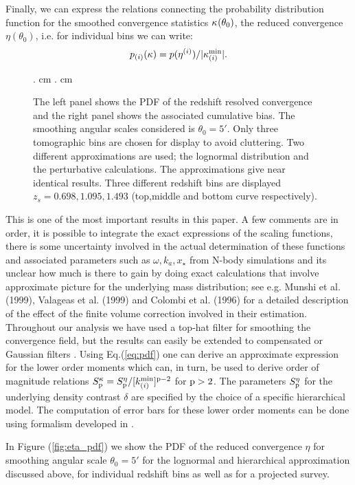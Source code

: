 \documentclass[usenatbib]{mn2e}
\def\be{\begin{equation}}
\def\ee{\end{equation}}
\def\be{\begin{equation}}
\def\ee{\end{equation}}
\begin{document}
Finally, we can express the relations connecting the probability distribution
function for the smoothed convergence statistics
$\kappa_{\rm  }({\theta_0})$, the reduced
convergence $\eta({\theta_0})$, i.e. for individual bins we can write:
\be
p_{(i)}(\kappa) ={p(\eta^{(i)})/|\kappa^{\rm min}_{(i)}|}.
\label{eq:pdf}
\ee
%
\begin{figure}
\begin{center}
{. cm . cm {}}
\end{center}
\caption{The left panel shows the PDF of the redshift resolved convergence and the right panel shows the associated cumulative
bias. The smoothing angular scales considered is $\theta_0 = 5'$. Only three tomographic bins are chosen for display to avoid cluttering. 
Two different approximations are used; the lognormal distribution and the perturbative calculations. The approximations 
give near identical results. Three different redshift bins are displayed $z_s=0.698,1.095,1.493$  (top,middle and bottom curve
respectively).}
\label{fig:kappa_pdf_bias}
\end{figure}
%
This is one of the most important results in this paper. 
A few comments are in order, it is possible to integrate the exact expressions of the scaling functions, 
there is some uncertainty involved in the actual determination of these functions and 
associated parameters such as $\omega, k_a, x_{\star}$ from N-body simulations and its 
unclear how much is there to gain by doing exact calculations that involve approximate picture for
the underlying mass distribution;  see e.g. Munshi et al. (1999), Valageas et al. (1999) and  
Colombi et al. (1996) for a detailed description of the effect  of the finite volume correction involved in their
estimation. Throughout our analysis we have used a top-hat filter for smoothing
the convergence field, but the results can easily be extended to
compensated or Gaussian filters \citep{BV00}. Using  Eq.(\ref{eq:pdf}) one can
derive an approximate expression for the lower order moments which can, in turn, be used
to derive order of magnitude relations $S^{\kappa}_{\rm p} = S^{\eta}_{\rm p}/[k^{\rm min}_{(i)}]^{{\rm p}-2}$ for $\rm p>2$.
The parameters $S^{\eta}_{\rm p}$ for the underlying density contrast $\delta$ are specified 
by the choice of a specific hierarchical model. The computation of error bars for these lower order 
moments can be done using formalism developed in \cite{MuCo03}.

In Figure (\ref{fig:eta_pdf}) we show the PDF of the reduced convergence $\eta$ for smoothing angular scale $\theta_0=5'$ for the lognormal and hierarchical approximation discussed above,
for individual redshift bins as well as for a projected survey. 
%
%
\end{document}

